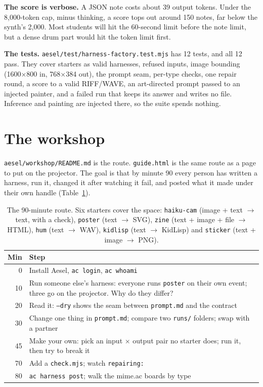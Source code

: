 \documentclass[10pt,letterpaper,twocolumn]{article}
\newcommand{\code}[1]{\texttt{#1}}
\begin{document}
\textbf{The score is verbose.} A JSON note costs about 39 output tokens.
Under the 8,000-token cap, minus thinking, a score tops out around 150 notes,
far below the synth's 2,000. Most students will hit the 60-second limit
before the note limit, but a dense drum part would hit the token limit first.

\textbf{The tests.} \code{aesel/test/harness-factory.test.mjs} has 12 tests,
and all 12 pass. They cover starters as valid harnesses, refused inputs,
image bounding (1600$\times$800 in, 768$\times$384 out), the prompt seam,
per-type checks, one repair round, a score to a valid RIFF/WAVE, an
art-directed prompt passed to an injected painter, and a failed run that
keeps its answer and writes no file. Inference and painting are injected
there, so the suite spends nothing.

\section{The workshop}
\label{sec:workshop}

\code{aesel/workshop/README.md} is the route. \code{guide.html} is the same
route as a page to put on the projector. The goal is that by minute 90 every
person has written a harness, run it, changed it after watching it fail, and
posted what it made under their own handle (Table~\ref{tab:route}).

\begin{table}[t]
\centering
\footnotesize
\setlength{\tabcolsep}{3pt}
\begin{tabularx}{\columnwidth}{@{}r X@{}}
\toprule
Min & Step \\
\midrule
0 & Install Aesel, \code{ac login}, \code{ac whoami} \\
10 & Run someone else's harness: everyone runs \code{poster} on their own event; three go on the projector. Why do they differ? \\
20 & Read it: \code{--dry} shows the seam between \code{prompt.md} and the contract \\
30 & Change one thing in \code{prompt.md}; compare two \code{runs/} folders; swap with a partner \\
45 & Make your own: pick an input $\times$ output pair no starter does; run it, then try to break it \\
70 & Add a \code{check.mjs}; watch \code{repairing:} \\
80 & \code{ac harness post}; walk the mime.ac boards by type \\
\bottomrule
\end{tabularx}
\caption{The 90-minute route. Six starters cover the space: \code{haiku-cam}
(image + text $\rightarrow$ text, with a check), \code{poster} (text
$\rightarrow$ SVG), \code{zine} (text + image + file $\rightarrow$ HTML),
\code{hum} (text $\rightarrow$ WAV), \code{kidlisp} (text $\rightarrow$
KidLisp) and \code{sticker} (text + image $\rightarrow$ PNG).}
\label{tab:route}
\end{table}
\end{document}
